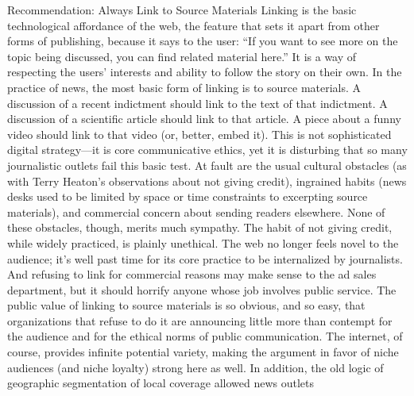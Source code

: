 Recommendation: Always Link to Source Materials
Linking is the basic technological affordance of the web, the feature that
sets it apart from other forms of publishing, because it says to the user:
``If you want to see more on the topic being discussed, you can find
related material here.'' It is a way of respecting the users’ interests and
ability to follow the story on their own.
In the practice of news, the most basic form of linking is to source
materials. A discussion of a recent indictment should link to the text of
that indictment. A discussion of a scientific article should link to that
article. A piece about a funny video should link to that video (or, better,
embed it).
This is not sophisticated digital strategy—it is core communicative ethics,
yet it is disturbing that so many journalistic outlets fail this basic test.
At fault are the usual cultural obstacles (as with Terry Heaton’s observations
about not giving credit), ingrained habits (news desks used to be
limited by space or time constraints to excerpting source materials), and
commercial concern about sending readers elsewhere.
None of these obstacles, though, merits much sympathy. The habit
of not giving credit, while widely practiced, is plainly unethical. The
web no longer feels novel to the audience; it’s well past time for its
core practice to be internalized by journalists. And refusing to link for
commercial reasons may make sense to the ad sales department, but it
should horrify anyone whose job involves public service.
The public value of linking to source materials is so obvious, and
so easy, that organizations that refuse to do it are announcing little
more than contempt for the audience and for the ethical norms of
public communication.
The internet, of course, provides infinite potential variety, making the argument
in favor of niche audiences (and niche loyalty) strong here as well. In addition,
the old logic of geographic segmentation of local coverage allowed news outlets

